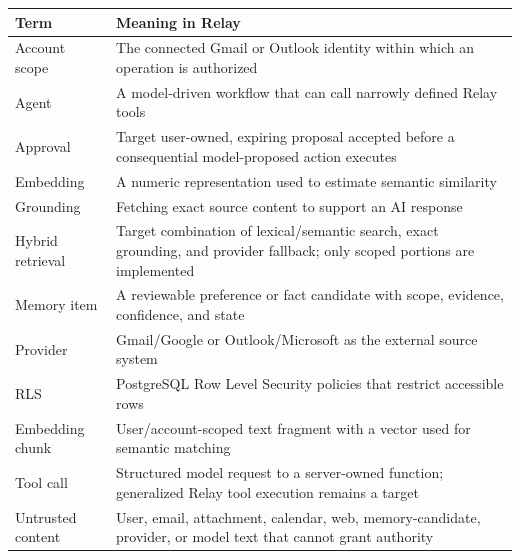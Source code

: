 \documentclass[
]{report}
\begin{document}
\begin{longtable}[]{@{}p{}p{}@{}}
\toprule\noalign{}
Term & Meaning in Relay \\
\midrule\noalign{}
\endhead
\bottomrule\noalign{}
\endlastfoot
Account scope & The connected Gmail or Outlook identity within which an
operation is authorized \\
Agent & A model-driven workflow that can call narrowly defined Relay
tools \\
Approval & Target user-owned, expiring proposal accepted before a
consequential model-proposed action executes \\
Embedding & A numeric representation used to estimate semantic
similarity \\
Grounding & Fetching exact source content to support an AI response \\
Hybrid retrieval & Target combination of lexical/semantic search, exact
grounding, and provider fallback; only scoped portions are implemented \\
Memory item & A reviewable preference or fact candidate with scope,
evidence, confidence, and state \\
Provider & Gmail/Google or Outlook/Microsoft as the external source
system \\
RLS & PostgreSQL Row Level Security policies that restrict accessible
rows \\
Embedding chunk & User/account-scoped text fragment with a vector used
for semantic matching \\
Tool call & Structured model request to a server-owned function;
generalized Relay tool execution remains a target \\
Untrusted content & User, email, attachment, calendar, web,
memory-candidate, provider, or model text that cannot grant authority \\
\end{longtable}
\end{document}
